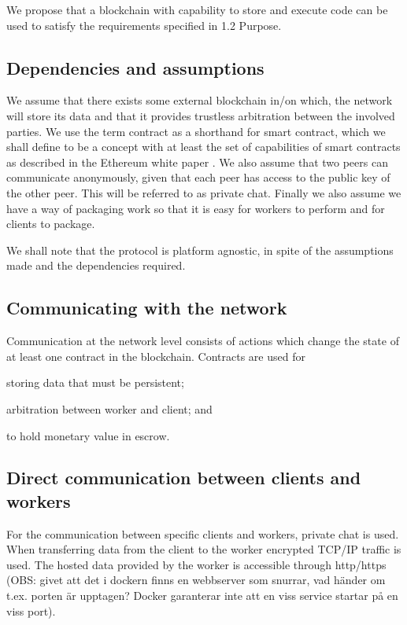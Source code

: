 We propose that a blockchain with capability to store and execute code can be used to satisfy the requirements specified in 1.2 Purpose.

\subsection{Dependencies and assumptions}
We assume that there exists some external blockchain in/on which, the network will store its data and that it provides trustless arbitration between the involved parties. We use the term contract as a shorthand for smart contract, which we shall define to be a concept with at least the set of capabilities of smart contracts as described in the Ethereum white paper \cite{ethereum:main}. We also assume that two peers can communicate anonymously, given that each peer has access to the public key of the other peer. This will be referred to as private chat. Finally we also assume we have a way of packaging work so that it is easy for workers to perform and for clients to package.

We shall note that the protocol is platform agnostic, in spite of the assumptions made and the dependencies required.

\subsection{Communicating with the network}
Communication at the network level consists of actions which change the state of at least one contract in the blockchain. Contracts are used for
\begin{inparaenum}
\item storing data that must be persistent;
\item arbitration between worker and client; and
\item to hold monetary value in escrow.
\end{inparaenum} 

\subsection{Direct communication between clients and workers}
For the communication between specific clients and workers, private chat is used. When transferring data from the client to the worker encrypted TCP/IP traffic is used. The hosted data provided by the worker is accessible through http/https (OBS: givet att det i dockern finns en webbserver som snurrar, vad händer om t.ex. porten är upptagen? Docker garanterar inte att en viss service startar på en viss port).

